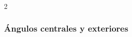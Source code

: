 \documentclass[12pt,examen,answers]{repaso_layout}
\begin{document}
\begin{questions}
{\begin{multicols}{2}
\begin{parts}



			\end{parts}
		\end{multicols}
	}

	\subsubsection{Ángulos centrales y exteriores}

\end{questions}
\end{document}

